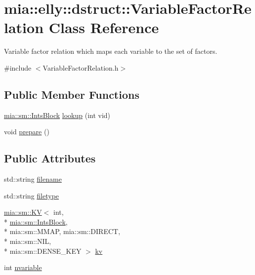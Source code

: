 \hypertarget{classmia_1_1elly_1_1dstruct_1_1_variable_factor_relation}{\section{mia\-:\-:elly\-:\-:dstruct\-:\-:Variable\-Factor\-Relation Class Reference}
\label{classmia_1_1elly_1_1dstruct_1_1_variable_factor_relation}
}


Variable factor relation which maps each variable to the set of factors.  




{\ttfamily \#include $<$Variable\-Factor\-Relation.\-h$>$}

\subsection*{Public Member Functions}
\begin{DoxyCompactItemize}
\item 
\hyperlink{classmia_1_1sm_1_1_ints_block}{mia\-::sm\-::\-Ints\-Block} \hyperlink{classmia_1_1elly_1_1dstruct_1_1_variable_factor_relation_a6f3b93d27d11f688cfe9952f057d9a3f}{lookup} (int vid)
\item 
void \hyperlink{classmia_1_1elly_1_1dstruct_1_1_variable_factor_relation_aa264b71ee5c828e06b85cd3588262cf3}{prepare} ()
\end{DoxyCompactItemize}
\subsection*{Public Attributes}
\begin{DoxyCompactItemize}
\item 
std\-::string \hyperlink{classmia_1_1elly_1_1dstruct_1_1_variable_factor_relation_a582e0a5fb2699076d5ec719a32613129}{filename}
\item 
std\-::string \hyperlink{classmia_1_1elly_1_1dstruct_1_1_variable_factor_relation_a14811849a23c099c5d1d9abb718f3d9f}{filetype}
\item 
\hyperlink{classmia_1_1sm_1_1_k_v}{mia\-::sm\-::\-K\-V}$<$ int, \\*
\hyperlink{classmia_1_1sm_1_1_ints_block}{mia\-::sm\-::\-Ints\-Block}, \\*
mia\-::sm\-::\-M\-M\-A\-P, mia\-::sm\-::\-D\-I\-R\-E\-C\-T, \\*
mia\-::sm\-::\-N\-I\-L, \\*
mia\-::sm\-::\-D\-E\-N\-S\-E\-\_\-\-K\-E\-Y $>$ \hyperlink{classmia_1_1elly_1_1dstruct_1_1_variable_factor_relation_ac009b6fd58e9f29f389e4c274abf1335}{kv}
\item 
int \hyperlink{classmia_1_1elly_1_1dstruct_1_1_variable_factor_relation_ac3f1f9186a88af83b82868b4077ccdc2}{nvariable}
\end{DoxyCompactItemize}


